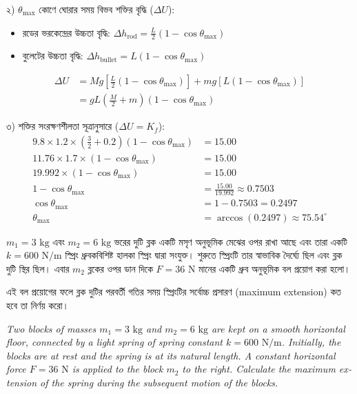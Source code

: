 \documentclass[12pt, a4paper]{article}
\begin{document}
\begin{tcolorbox}[solutionbox={সমাধান (Solution)}]
২) $\theta_{\max}$ কোণে ঘোরার সময় বিভব শক্তির বৃদ্ধি ($\Delta U$):
\begin{itemize}
    \item রডের ভরকেন্দ্রের উচ্চতা বৃদ্ধি: $\Delta h_{\text{rod}} = \frac{L}{2} (1 - \cos\theta_{\max})$
    \item বুলেটের উচ্চতা বৃদ্ধি: $\Delta h_{\text{bullet}} = L (1 - \cos\theta_{\max})$
\end{itemize}
\begin{align*}
    \Delta U &= M g \left[\frac{L}{2} (1 - \cos\theta_{\max})\right] + m g \left[L (1 - \cos\theta_{\max})\right] \\
             &= g L \left(\frac{M}{2} + m\right) (1 - \cos\theta_{\max})
\end{align*}

৩) শক্তির সংরক্ষণশীলতা সূত্রানুসারে ($\Delta U = K_f$):
\begin{align*}
    9.8 \times 1.2 \times \left(\frac{3}{2} + 0.2\right) (1 - \cos\theta_{\max}) &= 15.00 \\
    11.76 \times 1.7 \times (1 - \cos\theta_{\max}) &= 15.00 \\
    19.992 \times (1 - \cos\theta_{\max}) &= 15.00 \\
    1 - \cos\theta_{\max} &= \frac{15.00}{19.992} \approx 0.7503 \\
    \cos\theta_{\max} &= 1 - 0.7503 = 0.2497 \\
    \theta_{\max} &= \arccos(0.2497) \approx \mathbf{75.54^\circ}
\end{align*}
\end{tcolorbox}
\begin{tcolorbox}[questionbox={প্রশ্ন (Question) 15}]
\noindent
$m_1 = 3\text{ kg}$ এবং $m_2 = 6\text{ kg}$ ভরের দুটি ব্লক একটি মসৃণ অনুভূমিক মেঝের ওপর রাখা আছে এবং তারা একটি $k = 600\text{ N/m}$ স্প্রিং ধ্রুবকবিশিষ্ট হালকা স্প্রিং দ্বারা সংযুক্ত। শুরুতে স্প্রিংটি তার স্বাভাবিক দৈর্ঘ্যে ছিল এবং ব্লক দুটি স্থির ছিল। এবার $m_2$ ব্লকের ওপর ডান দিকে $F = 36\text{ N}$ মানের একটি ধ্রুব অনুভূমিক বল প্রয়োগ করা হলো। 

\vspace{0.3em}
\noindent
এই বল প্রয়োগের ফলে ব্লক দুটির পরবর্তী গতির সময় স্প্রিংটির সর্বোচ্চ প্রসারণ (maximum extension) কত হবে তা নির্ণয় করো।

\vspace{0.8em}
\begin{english}
\noindent\textit{\color{darkgray}
Two blocks of masses $m_1 = 3\text{ kg}$ and $m_2 = 6\text{ kg}$ are kept on a smooth horizontal floor, connected by a light spring of spring constant $k = 600\text{ N/m}$. Initially, the blocks are at rest and the spring is at its natural length. A constant horizontal force $F = 36\text{ N}$ is applied to the block $m_2$ to the right. Calculate the maximum extension of the spring during the subsequent motion of the blocks.
}
\end{english}
\end{tcolorbox}
\end{document}
